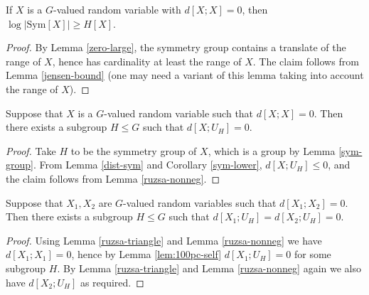 \begin{corollary}\label{sym-lower} If $X$ is a $G$-valued random variable with $d[X;X]=0$, then $\log |\mathrm{Sym}[X]| \geq H[X]$.
\end{corollary}

\begin{proof}  By Lemma \ref{zero-large}, the symmetry group contains a translate of the range of $X$, hence has cardinality at least the range of $X$.  The claim follows from Lemma \ref{jensen-bound} (one may need a variant of this lemma taking into account the range of $X$).
\end{proof}


\begin{lemma}\label{lem:100pc-self}
  \leanok
  Suppose that $X$ is a $G$-valued random variable such that
  $d[X;X]=0$. Then there exists a subgroup $H \leq G$ such that $d[X;U_H] = 0$.
\end{lemma}

\begin{proof}
Take $H$ to be the symmetry group of $X$, which is a group by Lemma \ref{sym-group}. From Lemma \ref{dist-sym} and Corollary \ref{sym-lower}, $d[X;U_H] \leq 0$, and the claim follows from Lemma \ref{ruzsa-nonneg}.
\end{proof}

\begin{corollary}\label{lem:100pc}
  \leanok
  Suppose that $X_1,X_2$ are $G$-valued random variables such that
  $d[X_1;X_2]=0$. Then there exists a subgroup $H \leq G$ such that $d[X_1;U_H] = d[X_2;U_H] = 0$.
\end{corollary}

\begin{proof}
Using Lemma \ref{ruzsa-triangle} and Lemma \ref{ruzsa-nonneg} we have $d[X_1;X_1]=0$, hence by Lemma \ref{lem:100pc-self} $d[X_1;U_H]=0$ for some subgroup $H$.  By Lemma \ref{ruzsa-triangle} and Lemma \ref{ruzsa-nonneg} again we also have $d[X_2;U_H]$ as required.
\end{proof}

